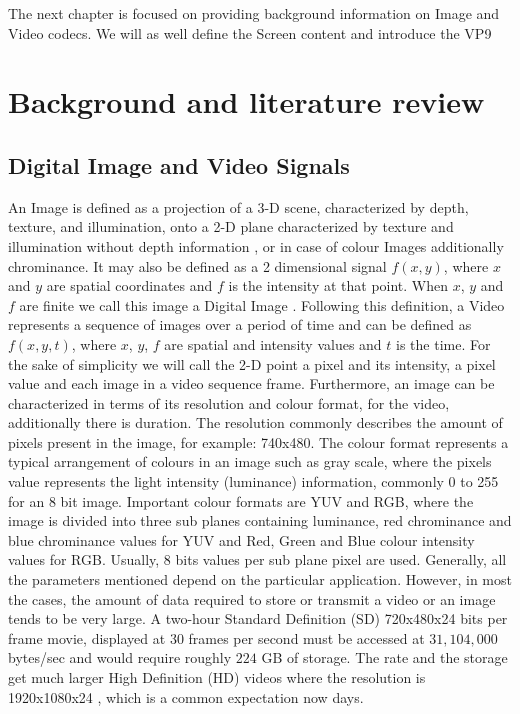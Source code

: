 \documentclass[a4paper,11pt,oneside]{article}
\begin{document}
\indent The next chapter is focused on providing background information on Image and Video codecs. We will as well define the Screen content and introduce the VP9 \\

\newpage
\section{Background and literature review}
\subsection{Digital Image and Video Signals}
\indent An Image is defined as a projection of a 3-D scene, characterized by depth, texture, and illumination, onto a 2-D plane characterized by texture and illumination without depth information \cite[pp.~5]{richardson2002video}, or in case of colour Images additionally chrominance. It may also be defined as a 2 dimensional signal $ f(x, y) $, where $x$ and $y$ are spatial coordinates and $f$ is the intensity at that point. When $x$, $y$ and $f$ are finite we call this image a Digital Image \cite[ppp.~1]{gonzalez2008digital}. 
Following this definition, a Video represents a sequence of images over a period of time and can be defined as $f(x,y,t)$, where $x$, $y$, $f$ are spatial and intensity values and $t$ is the time.
For the sake of simplicity we will call the 2-D point a pixel and its intensity, a pixel value and each image in a video sequence frame.
Furthermore, an image can be characterized in terms of its resolution and colour format, for the video, additionally there is duration. The resolution
commonly describes the amount of pixels present in the image, for example: 740x480. The colour format represents a typical arrangement of colours in an image such as gray scale, where the pixels value represents the light intensity (luminance) information, commonly 0 to 255 for an 8 bit image. Important colour formats are YUV and RGB, where the image is divided into three sub planes containing luminance, red chrominance and blue chrominance values for YUV and Red, Green and Blue colour intensity values for RGB. Usually, 8 bits values per sub plane pixel are used. Generally, all the parameters mentioned depend on the particular application. However, in most the cases, the amount of data required to store or transmit a video or an image tends to be very large. A two-hour Standard Definition (SD) 720x480x24 bits per frame movie, displayed at 30 frames per second must be accessed
at $ 31,104,000 $ bytes/sec and would require roughly $224$ GB of storage. The rate and the storage get much larger High Definition (HD) videos where the resolution is 1920x1080x24 \cite[pp.~525-526]{gonzalez2008digital}, which is a common expectation now days. \\
\end{document}
